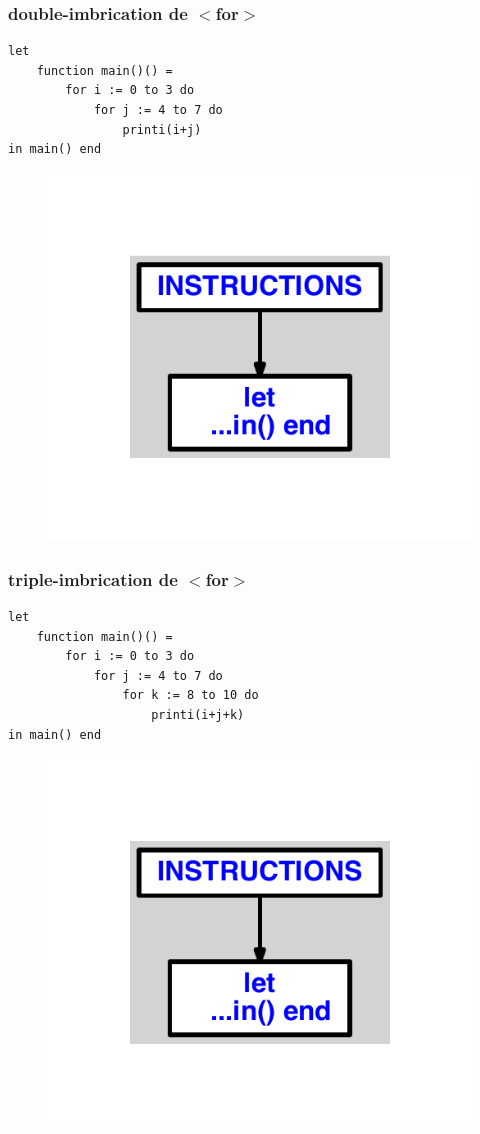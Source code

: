 \documentclass{article}
\begin{document}
\subsubsection{double-imbrication de $ < $for$ > $}
\begin{lstlisting}
let
	function main()() =
		for i := 0 to 3 do
			for j := 4 to 7 do
				printi(i+j)
in main() end
\end{lstlisting}
\newpage
\begin{figure}[H]
\centering
\includegraphics[max width=\textwidth]{ast/ast_209.pdf}
\end{figure}
\newpage
\subsubsection{triple-imbrication de $ < $for$ > $}
\begin{lstlisting}
let
	function main()() =
		for i := 0 to 3 do
			for j := 4 to 7 do
				for k := 8 to 10 do
					printi(i+j+k)
in main() end
\end{lstlisting}
\newpage
\begin{figure}[H]
\centering
\includegraphics[max width=\textwidth]{ast/ast_210.pdf}
\end{figure}
\newpage
\end{document}
